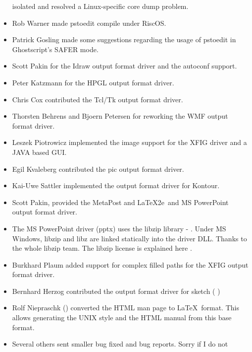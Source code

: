 \documentclass[english,a4paper]{article}
\begin{document}
\begin{itemize}
      isolated and resolved a
     Linux-specific core dump problem.
  \item Rob Warner  made pstoedit compile under RiscOS.
  \item Patrick Gosling  made some suggestions
     regarding the usage of pstoedit in Ghostscript's SAFER mode.
  \item Scott Pakin  for the Idraw output format driver and the
	autoconf support.
  \item Peter Katzmann  for the HPGL output format driver.
  \item Chris Cox  contributed the Tcl/Tk output format driver.
  \item Thorsten Behrens  and
     Bjoern Petersen for reworking the WMF output format driver.
  \item Leszek Piotrowicz  implemented the image
     support for the XFIG driver and a JAVA based GUI.
  \item Egil Kvaleberg  contributed the pic output format driver.
  \item Kai-Uwe Sattler  implemented the
     output format driver for Kontour.
  \item Scott Pakin,  provided the MetaPost and \LaTeX2e\ and MS PowerPoint output format driver.
  \item The MS PowerPoint driver (pptx) uses the libzip library - . Under MS Windows, libzip and libz are linked statically into the driver DLL. Thanks to the whole libzip team. The libzip license is explained here .
  \item Burkhard Plaum  added support for
     complex filled paths for the XFIG output format driver.
  \item Bernhard Herzog  contributed the output format driver for
     sketch (  )
  \item Rolf Niepraschk () converted the HTML man page
     to \LaTeX\  format. This allows generating the UNIX style and the HTML manual from this
     base format.
  \item Several others sent smaller bug fixed and bug reports. Sorry if I do not

\end{itemize}
\end{document}
